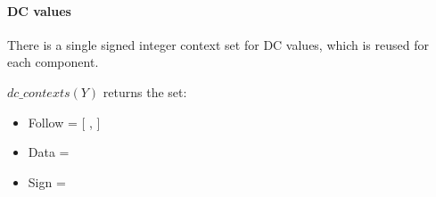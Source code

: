 \paragraph{DC values}
\label{dcvaluecontexts}

There is a single signed integer context set for DC values, which is reused for each component. 

$dc\_contexts(Y)$ returns the set:

\begin{itemize}
\item Follow = [ \DCFollowOne, \DCFollowTwoPlus ]
\item Data = \DCData
\item Sign = \DCSign
\end{itemize}

